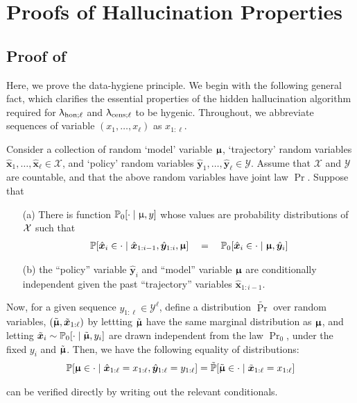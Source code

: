 


\section{Proofs of Hallucination Properties \label{sec:proofs_for_hhh}}


\subsection{Proof of  \label{proof:lem_data_hygiene}}
	Here, we prove the data-hygiene principle. We begin with the following general fact, which clarifies the essential properties of the hidden hallucination algorithm required for $\uplambda_{\mathrm{hon};\ell}$ and $\uplambda_{\mathrm{cens};\ell}$ to be hygenic. Throughout, we abbreviate sequences of variable $(x_1,\dots,x_{\ell})$ as $x_{1:\ell}$.
	\begin{fact}\label{fact:conditional_fact} Consider a collection of random `model' variable $\bm{\upmu}$, `trajectory' random variables $\hat{\bm{x}}_1,\dots,\hat{\bm{x}}_{\ell} \in \mathcal{X}$, and `policy' random variables $\hat{\bm{y}}_1,\dots,\hat{\bm{y}}_{\ell} \in \mathcal{Y}$. Assume that $\mathcal{X}$ and $\mathcal{Y}$ are countable, and that the above random variables have joint law $\Pr$. Suppose that
	\begin{itemize}
	\item[(a)] There is function $\operatorname{\mathbb{P}}_0[\cdot \mid \upmu,y]$ whose values are probability distributions of $\mathcal{X}$ such that %
	\begin{align*}
	\operatorname{\mathbb{P}}[\hat{\bm{x}}_{i} \in \cdot \mid \hat{\bm{x}}_{1:i-1},\hat{\bm{y}}_{1:i}, \bm{\upmu}]  \quad=\quad \operatorname{\mathbb{P}}_0[\hat{\bm{x}}_{i}  \in \cdot \mid \bm{\upmu}, \hat{\bm{y}}_i]
	\end{align*}
	\item[(b)] the ``policy'' variable  $\hat{\bm{y}}_{i}$ and ``model'' variable $\bm{\upmu}$ are conditionally independent  given the past ``trajectory'' variables $\hat{\bm{x}}_{1:i-1}$.
\end{itemize}
	Now, for a given sequence $y_{1:\ell} \in \mathcal{Y}^\ell$, define a distribution  $\tilde{\Pr}$ over random variables, $(\tilde{\bm{\upmu}}, \tilde{\bm{x}}_{1:\ell})$ by lettting $\tilde{\bm{\upmu}}$ have the same marginal distribution as $\bm{\upmu}$, and letting $\tilde{\bm{x}}_{i} \sim \operatorname{\mathbb{P}}_0[\cdot \mid \tilde{\bm{\upmu}},y_i]$ are drawn independent from the law $\Pr_0$, under the fixed $y_i$ and $\tilde{\bm{\upmu}}$. Then, we have the following equality of distributions:
	\begin{align}
	\operatorname{\mathbb{P}}[\bm{\upmu} \in \cdot \mid \hat{\bm{x}}_{1:\ell} = x_{1:\ell}, \hat{\bm{y}}_{1:\ell}= y_{1:\ell}] = \tilde{\operatorname{\mathbb{P}}}[\tilde{\bm{\upmu}} \in \cdot \mid \tilde{\bm{x}}_{1:\ell} = x_{1:\ell}] \label{eq:useful_fact}
	\end{align}
	\end{fact}
  can be verified directly by writing out the relevant conditionals.

